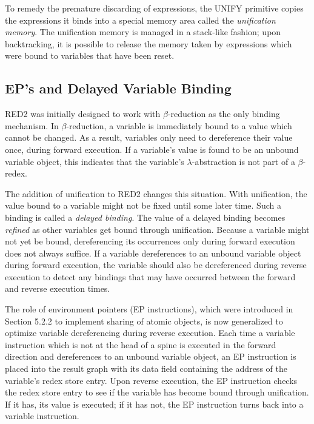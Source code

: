 To remedy the premature discarding of expressions, the UNIFY primitive copies
the expressions it binds into a special memory area called the \emph{unification
memory}. The unification memory is managed in a stack-like fashion; upon
backtracking, it is possible to release the memory taken by expressions which
were bound to variables that have been reset.

\subsection{EP's and Delayed Variable Binding}

RED2 was initially designed to work with \(\beta\)-reduction as the only binding
mechanism. In \(\beta\)-reduction, a variable is immediately bound to a value
which cannot be changed. As a result, variables only need to dereference their
value once, during forward execution. If a variable's value is found to be an
unbound variable object, this indicates that the variable's
\(\lambda\)-abstraction is not part of a \(\beta\)-redex.

The addition of unification to RED2 changes this situation. With unification,
the value bound to a variable might not be fixed until some later time. Such a
binding is called a \emph{delayed binding}. The value of a delayed binding becomes
\emph{refined} as other variables get bound through unification. Because a variable
might not yet be bound, dereferencing its occurrences only during forward
execution does not always suffice. If a variable dereferences to an unbound
variable object during forward execution, the variable should also be
dereferenced during reverse execution to detect any bindings that may have
occurred between the forward and reverse execution times.

The role of environment pointers (EP instructions), which were introduced in
Section 5.2.2 to implement sharing of atomic objects, is now generalized to
optimize variable dereferencing during reverse execution. Each time a variable
instruction which is not at the head of a spine is executed in the forward
direction and dereferences to an unbound variable object, an EP instruction is
placed into the result graph with its data field containing the address of the
variable's redex store entry. Upon reverse execution, the EP instruction checks
the redex store entry to see if the variable has become bound through
unification. If it has, its value is executed; if it has not, the EP instruction
turns back into a variable instruction.

